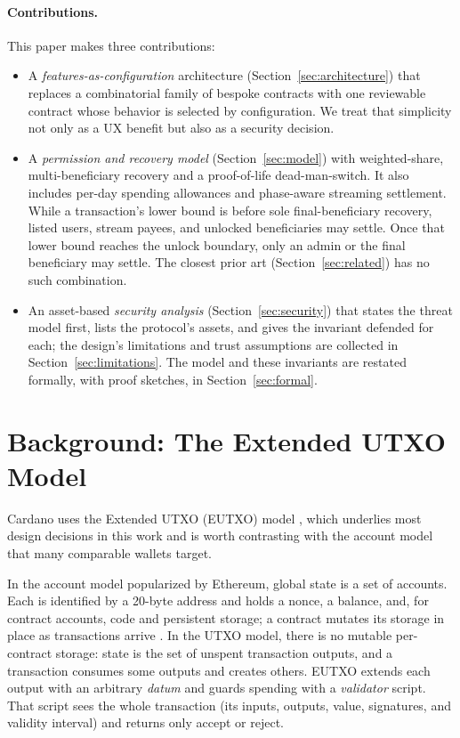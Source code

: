 \documentclass[11pt,DIV=11,parskip=half-]{scrartcl}
\begin{document}
\paragraph{Contributions.} This paper makes three contributions:
\begin{itemize}
 \setlength\itemsep{0.3em}
\item A \emph{features-as-configuration} architecture (Section~\ref{sec:architecture}) that replaces a combinatorial family of bespoke contracts with one reviewable contract whose behavior is selected by configuration. We treat that simplicity not only as a UX benefit but also as a security decision.
\item A \emph{permission and recovery model} (Section~\ref{sec:model}) with weighted-share, multi-beneficiary recovery and a proof-of-life dead-man-switch. It also includes per-day spending allowances and phase-aware streaming settlement. While a transaction's lower bound is before sole final-beneficiary recovery, listed users, stream payees, and unlocked beneficiaries may settle. Once that lower bound reaches the unlock boundary, only an admin or the final beneficiary may settle. The closest prior art (Section~\ref{sec:related}) has no such combination.
\item An asset-based \emph{security analysis} (Section~\ref{sec:security}) that states the threat model first, lists the protocol's assets, and gives the invariant defended for each; the design's limitations and trust assumptions are collected in Section~\ref{sec:limitations}. The model and these invariants are restated formally, with proof sketches, in Section~\ref{sec:formal}.
\end{itemize}

\section{Background: The Extended UTXO Model}
\label{sec:background}

Cardano uses the Extended UTXO (EUTXO) model \cite{eutxoPaper}, which underlies most design decisions in this work and is worth contrasting with the account model that many comparable wallets target.

In the account model popularized by Ethereum, global state is a set of accounts. Each is identified by a 20-byte address and holds a nonce, a balance, and, for contract accounts, code and persistent storage; a contract mutates its storage in place as transactions arrive \cite{buterinWhitepaper}. In the UTXO model, there is no mutable per-contract storage: state is the set of unspent transaction outputs, and a transaction consumes some outputs and creates others. EUTXO extends each output with an arbitrary \emph{datum} and guards spending with a \emph{validator} script. That script sees the whole transaction (its inputs, outputs, value, signatures, and validity interval) and returns only accept or reject.
\end{document}
